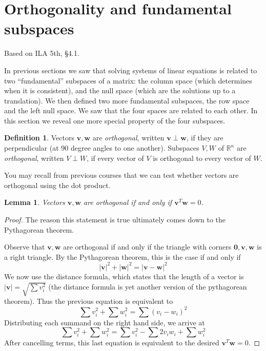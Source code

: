 \documentclass[11pt,oneside]{amsbook}
\newcommand{\R}{\mathbb R}
\theoremstyle{definition}
\theoremstyle{plain}
\newtheorem{lemma}[theorem]{Lemma}
\theoremstyle{definition}
\newtheorem{definition}[theorem]{Definition}
\theoremstyle{remark}
\numberwithin{equation}{section}
\numberwithin{figure}{section}
\begin{document}
\newpage
\section{Orthogonality and fundamental subspaces}

Based on ILA 5th, \S 4.1.

In previous sections we saw that solving systems of linear equations is related to two ``fundamental'' subspaces of a matrix: the column space (which determines when it is consistent), and the null space (which are the solutions up to a translation). We then defined two more fundamental subspaces, the row space and the left null space. We saw that the four spaces are related to each other. In this section we reveal one more special property of the four subspaces.

\begin{definition}
  Vectors $\mathbf{v},\mathbf{w}$ are \emph{orthogonal}, written $\mathbf{v}\perp\mathbf{w}$, if they are perpendicular (at 90 degree angles to one another). Subspaces $V,W$ of $\R^n$ are \emph{orthogonal}, written $V\perp W$, if every vector of $V$ is orthogonal to every vector of $W$.
\end{definition}

You may recall from previous courses that we can test whether vectors are orthogonal using the dot product.

\begin{lemma}
  Vectors $\mathbf{v},\mathbf{w}$ are orthogonal if and only if $\mathbf{v}^T\mathbf{w}=0$.
\end{lemma}

\begin{proof}
  The reason this statement is true ultimately comes down to the Pythagorean theorem.

  Observe that $\mathbf{v},\mathbf{w}$ are orthogonal if and only if the triangle with corners $\mathbf{0},\mathbf{v},\mathbf{w}$ is a right triangle. By the Pythagorean theorem, this is the case if and only if
  \[|\mathbf{v}|^2+|\mathbf{w}|^2=|\mathbf{v-w}|^2
  \]
  We now use the distance formula, which states that the length of a vector is $|\mathbf{v}|=\sqrt{\sum v_i^2}$ (the distance formula is yet another version of the pythagorean theorem). Thus the previous equation is equivalent to
  \[\sum v_i^2+\sum w_i^2=\sum(v_i-w_i)^2
  \]
  Distributing each summand on the right hand side, we arrive at
  \[\sum v_i^2+\sum w_i^2=\sum v_i^2-\sum 2v_iw_i+\sum w_i^2
  \]
  After cancelling terms, this last equation is equivalent to the desired $\mathbf{v}^T\mathbf{w}=0$.
\end{proof}
\end{document}
